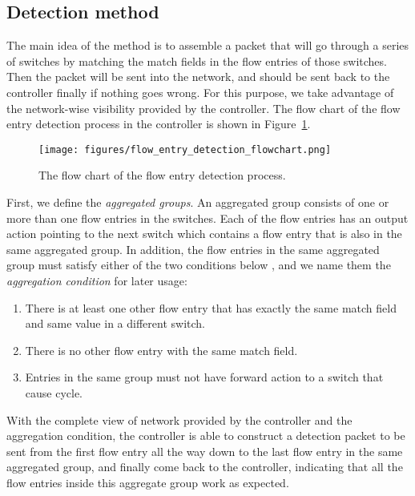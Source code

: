 \subsection{Detection method}
\label{Detection_method}
The main idea of the method is to assemble a packet that will go through a series of switches by matching the match fields in the flow entries of those switches. Then the packet will be sent into the network, and should be sent back to the controller finally if nothing goes wrong. For this purpose, we take advantage of the network-wise visibility provided by the controller. The flow chart of the flow entry detection process in the controller is shown in Figure~\ref{flow_entry_detection_flowchart}. 

\begin{figure}[H]
\begin{center} 
\texttt{[image: figures/flow\_entry\_detection\_flowchart.png]}
\end{center}
\caption{The flow chart of the flow entry detection process.}
\label{flow_entry_detection_flowchart}
\end{figure}

First, we define the \textit{aggregated groups}. An aggregated group consists of one or more than one flow entries in the switches. Each of the flow entries has an output action pointing to the next switch which contains a flow entry that is also in the same aggregated group. In addition, the flow entries in the same aggregated group must satisfy either of the two conditions below , and we name them the \textit{aggregation condition} for later usage: 
\begin{enumerate}
\item
There is at least one other flow entry that has exactly the same match field and same value in a different switch.
\item
There is no other flow entry with the same match field.
\item
Entries in the same group must not have forward action to a switch that cause cycle.
\end{enumerate}

With the complete view of network provided by the controller and the aggregation condition, the controller is able to construct a detection packet to be sent from the first flow entry all the way down to the last flow entry in the same aggregated group, and finally come back to the controller, indicating that all the flow entries inside this aggregate group work as expected. 

